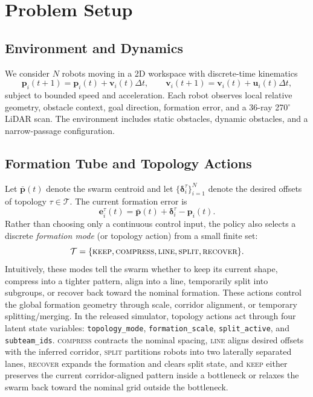 \documentclass[journal]{IEEEtran}
\newcommand{\cT}{\mathcal{T}}
\newcommand{\bfu}{\mathbf{u}}
\newcommand{\bfp}{\mathbf{p}}
\newcommand{\bfv}{\mathbf{v}}
\newcommand{\bfe}{\mathbf{e}}
\begin{document}
\section{Problem Setup}
\label{sec:problem}

\subsection{Environment and Dynamics}
We consider $N$ robots moving in a 2D workspace with discrete-time
kinematics
\begin{equation}
\bfp_i(t+1) = \bfp_i(t) + \bfv_i(t)\Delta t,\qquad
\bfv_i(t+1) = \bfv_i(t) + \bfu_i(t)\Delta t,
\label{eq:dynamics}
\end{equation}
subject to bounded speed and acceleration.
Each robot observes local relative geometry, obstacle context,
goal direction, formation error, and a 36-ray 270$^\circ$ LiDAR scan.
The environment includes static obstacles, dynamic obstacles, and a
narrow-passage configuration.

\subsection{Formation Tube and Topology Actions}
Let $\bar{\bfp}(t)$ denote the swarm centroid and let
$\{\bm{\delta}_i^\tau\}_{i=1}^N$ denote the desired offsets of topology
$\tau \in \cT$. The current formation error is
\begin{equation}
\bfe_i^\tau(t) = \bar{\bfp}(t) + \bm{\delta}_i^\tau - \bfp_i(t).
\end{equation}
Rather than choosing only a continuous control input, the policy also
selects a discrete \emph{formation mode} (or topology action) from a
small finite set:
\begin{equation}
\cT=\{\textsc{keep},\textsc{compress},\textsc{line},
\textsc{split},\textsc{recover}\}.
\end{equation}
Intuitively, these modes tell the swarm whether to keep its current
shape, compress into a tighter pattern, align into a line, temporarily
split into subgroups, or recover back toward the nominal formation.
These actions control the global formation geometry through scale,
corridor alignment, or temporary splitting/merging.
In the released simulator, topology actions act through four latent
state variables: \texttt{topology\_mode},
\texttt{formation\_scale}, \texttt{split\_active}, and
\texttt{subteam\_ids}. \textsc{compress} contracts the nominal spacing,
\textsc{line} aligns desired offsets with the inferred corridor,
\textsc{split} partitions robots into two laterally separated lanes,
\textsc{recover} expands the formation and clears split state, and
\textsc{keep} either preserves the current corridor-aligned pattern
inside a bottleneck or relaxes the swarm back toward the nominal grid
outside the bottleneck.
\end{document}
